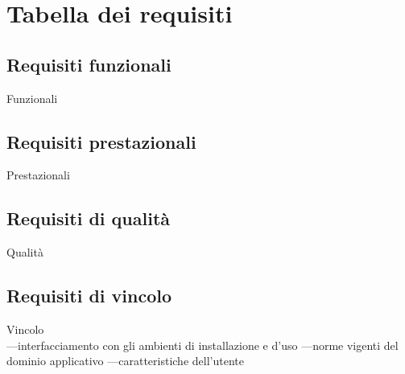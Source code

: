 \section{Tabella dei requisiti}

\subsection{Requisiti funzionali}
Funzionali

\subsection{Requisiti prestazionali}
Prestazionali

\subsection{Requisiti di qualità}
Qualità

\subsection{Requisiti di vincolo}
Vincolo\\
---interfacciamento con gli ambienti di installazione e d'uso
---norme vigenti del dominio applicativo
---caratteristiche dell'utente